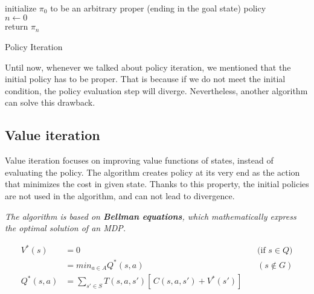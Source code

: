 \LinesNumbered
\begin{algorithm}[H]
\SetAlgoLined
initialize $\pi_0$ to be an arbitrary proper (ending in the goal state) policy \\
$n \xleftarrow{} 0$ \\
return $\pi_n$
\caption{Policy Iteration}
\end{algorithm}

Until now, whenever we talked about policy iteration, we mentioned that the initial policy has to be proper.
That is because if we do not meet the initial condition, the policy evaluation step will diverge.
Nevertheless, another algorithm can solve this drawback.


\subsection{Value iteration}
Value iteration focuses on improving value functions of states, instead of evaluating the policy. The algorithm creates policy at its very end as the action that minimizes the cost in given state. Thanks to this property, the initial policies are not used in the algorithm, and can not lead to divergence.

\textit{The algorithm is based on \textbf{Bellman equations}, which mathematically express the optimal solution of an MDP.}

\begin{equation}
\begin{aligned}
V^* (s) & = 0 && \text{(if $s \in Q$)} \\
& = min_{a \in A} Q^* (s, a) &&  (s \notin G) \\ 
Q^* (s, a) & = \sum_{s' \in S} T(s, a, s')[ \,C(s, a, s') + V^*(s')] \, \\
\end{aligned}
\end{equation}

